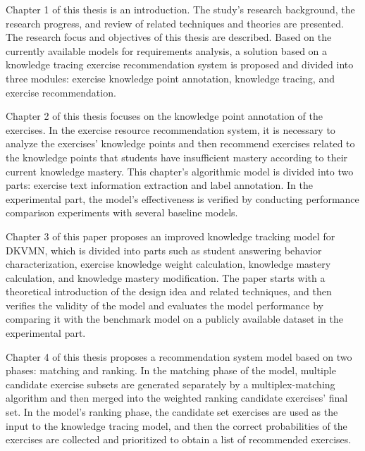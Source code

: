 
Chapter 1 of this thesis is an introduction. The study's research background, the research progress, and review of related techniques and theories are presented. The research focus and objectives of this thesis are described. Based on the currently available models for requirements analysis, a solution based on a knowledge tracing exercise recommendation system is proposed and divided into three modules: exercise knowledge point annotation, knowledge tracing, and exercise recommendation.

Chapter 2 of this thesis focuses on the knowledge point annotation of the exercises. In the exercise resource recommendation system, it is necessary to analyze the exercises' knowledge points and then recommend exercises related to the knowledge points that students have insufficient mastery according to their current knowledge mastery. This chapter's algorithmic model is divided into two parts: exercise text information extraction and label annotation. In the experimental part, the model's effectiveness is verified by conducting performance comparison experiments with several baseline models.

Chapter 3 of this paper proposes an improved knowledge tracking model for DKVMN, which is divided into parts such as student answering behavior characterization, exercise knowledge weight calculation, knowledge mastery calculation, and knowledge mastery modification. The paper starts with a theoretical introduction of the design idea and related techniques, and then verifies the validity of the model and evaluates the model performance by comparing it with the benchmark model on a publicly available dataset in the experimental part.

Chapter 4 of this thesis proposes a recommendation system model based on two phases: matching and ranking. In the matching phase of the model, multiple candidate exercise subsets are generated separately by a multiplex-matching algorithm and then merged into the weighted ranking candidate exercises' final set. In the model's ranking phase, the candidate set exercises are used as the input to the knowledge tracing model, and then the correct probabilities of the exercises are collected and prioritized to obtain a list of recommended exercises.

